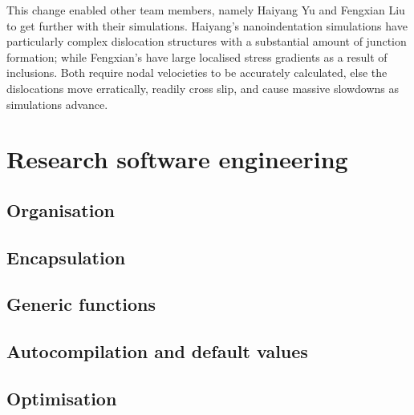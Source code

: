 This change enabled other team members, namely Haiyang Yu and Fengxian Liu to get further with their simulations. Haiyang's nanoindentation simulations have particularly complex dislocation structures with a substantial amount of junction formation; while Fengxian's have large localised stress gradients as a result of inclusions. Both require nodal velocieties to be accurately calculated, else the dislocations move erratically, readily cross slip, and cause massive slowdowns as simulations advance.

\section{Research software engineering}
\subsection{Organisation}
\subsection{Encapsulation}
\subsection{Generic functions}
\subsection{Autocompilation and default values}
\subsection{Optimisation}

